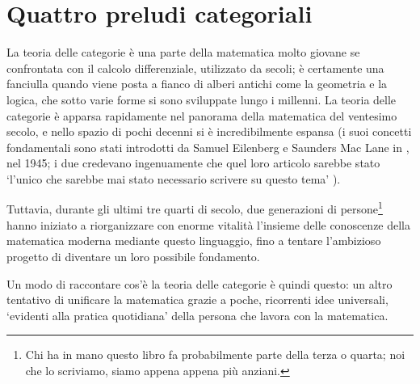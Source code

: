 \chapter{Quattro preludi categoriali}\label{cap_preludi}
La teoria delle categorie è una parte della matematica molto giovane se confrontata con il calcolo differenziale, utilizzato da secoli; è certamente una fanciulla quando viene posta a fianco di alberi antichi come la geometria e la logica, che sotto varie forme si sono sviluppate lungo i millenni. La teoria delle categorie è apparsa rapidamente nel panorama della matematica del ventesimo secolo, e nello spazio di pochi decenni si è incredibilmente espansa (i suoi concetti fondamentali sono stati introdotti da Samuel Eilenberg e Saunders Mac Lane in \cite{gtone}, nel 1945; i due credevano ingenuamente che quel loro articolo sarebbe stato `l'unico che sarebbe mai stato necessario scrivere su questo tema' \cite{}).

Tuttavia, durante gli ultimi tre quarti di secolo, due generazioni di persone\footnote{Chi ha in mano questo libro fa probabilmente parte della terza o quarta; noi che lo scriviamo, siamo appena appena più anziani.} hanno iniziato a riorganizzare con enorme vitalità l'insieme delle conoscenze della matematica moderna mediante questo linguaggio, fino a tentare l'ambizioso progetto di diventare un loro possibile fondamento.

Un modo di raccontare cos'è la teoria delle categorie è quindi questo: un altro tentativo di unificare la matematica grazie a poche, ricorrenti idee universali, `evidenti alla pratica quotidiana' della persona che lavora con la matematica.
\medskip

